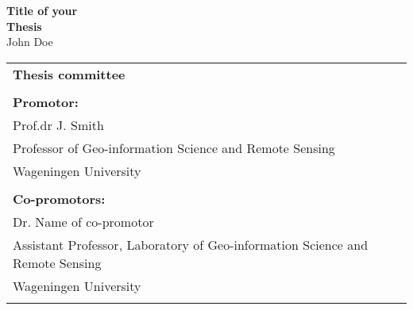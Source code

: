 \thispagestyle{empty}
\begin{center}
\Huge{\textbf{Title of your}} \\
\Huge{\textbf{Thesis}} \\
\vspace*{1cm}
\vspace*{1cm}
\vspace*{\fill}
\large{John Doe}\\
\end{center}

\newpage
\thispagestyle{empty}
\vspace*{\fill}
\begin{tabular}{l}
    \textbf{Thesis committee}                                                                 \\  
                                                                                              \\  
    \textbf{Promotor:}                                                                        \\  
    Prof.dr J. Smith                                                                          \\  
    Professor of Geo-information Science and Remote Sensing                                   \\  
    Wageningen University                                                                     \\  
                                                                                              \\  
    \textbf{Co-promotors:}                                                                    \\  
    Dr. Name of co-promotor                                                                   \\  
    Assistant Professor, Laboratory of Geo-information Science and Remote Sensing             \\  
    Wageningen University                                                                     \\  
                                                                                              \\  


\end{tabular}
